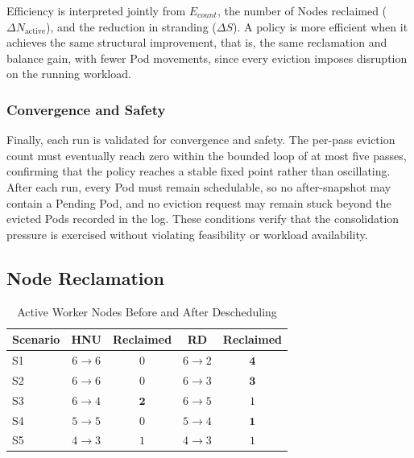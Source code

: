 Efficiency is interpreted jointly from \(E_{count}\), the number of Nodes reclaimed (\(\Delta N_{\text{active}}\)), and the reduction in stranding (\(\Delta S\)). A policy is more efficient when it achieves the same structural improvement, that is, the same reclamation and balance gain, with fewer Pod movements, since every eviction imposes disruption on the running workload.

\subsubsection{Convergence and Safety}
\label{subsubsec:defrag_metric_safety}
Finally, each run is validated for convergence and safety. The per-pass eviction count must eventually reach zero within the bounded loop of at most five passes, confirming that the policy reaches a stable fixed point rather than oscillating. After each run, every Pod must remain schedulable, so no after-snapshot may contain a Pending Pod, and no eviction request may remain stuck beyond the evicted Pods recorded in the log. These conditions verify that the consolidation pressure is exercised without violating feasibility or workload availability.

\subsection{Node Reclamation}
\label{sec:defrag_node_reclamation}

\begin{table}[H]
    \centering
    \caption{Active Worker Nodes Before and After Descheduling}
    \label{tab:defrag_node_reclamation}
    \renewcommand{\arraystretch}{1.2}
    \begin{tabular}{l c c c c}
        \hline
        \textbf{Scenario} & \textbf{HNU} & \textbf{Reclaimed} & \textbf{RD} & \textbf{Reclaimed} \\
        \hline
        S1 & \(6 \rightarrow 6\) & \(0\) & \(6 \rightarrow 2\) & \(\mathbf{4}\) \\
        S2 & \(6 \rightarrow 6\) & \(0\) & \(6 \rightarrow 3\) & \(\mathbf{3}\) \\
        S3 & \(6 \rightarrow 4\) & \(\mathbf{2}\) & \(6 \rightarrow 5\) & \(1\) \\
        S4 & \(5 \rightarrow 5\) & \(0\) & \(5 \rightarrow 4\) & \(\mathbf{1}\) \\
        S5 & \(4 \rightarrow 3\) & \(1\) & \(4 \rightarrow 3\) & \(1\) \\
        \hline
    \end{tabular}
\end{table}

